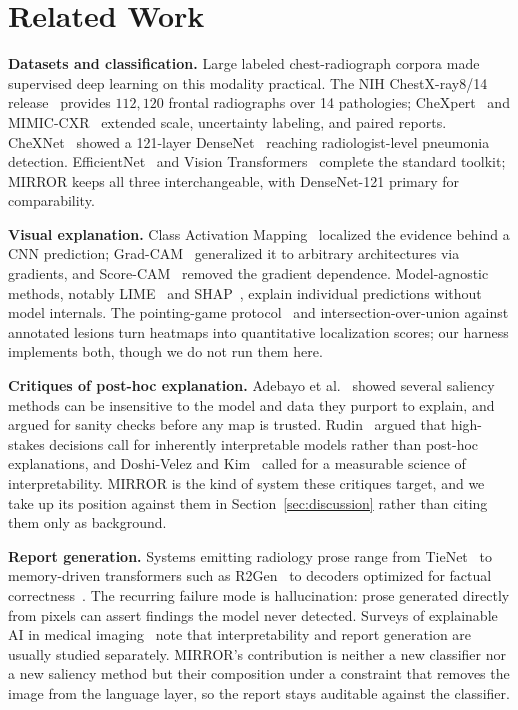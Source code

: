 \documentclass[conference]{IEEEtran}
\newcommand{\rih}[1]{\textbf{#1}\enspace\ignorespaces}
\begin{document}
\section{Related Work}
\label{sec:litreview}

\rih{Datasets and classification.} Large labeled chest-radiograph corpora made
supervised deep learning on this modality practical. The NIH ChestX-ray8/14
release~\cite{wang2017chestxray} provides $112{,}120$ frontal radiographs over 14
pathologies; CheXpert~\cite{irvin2019chexpert} and MIMIC-CXR~\cite{johnson2019mimiccxr}
extended scale, uncertainty labeling, and paired reports. CheXNet~\cite{rajpurkar2017chexnet}
showed a 121-layer DenseNet~\cite{huang2017densenet} reaching radiologist-level
pneumonia detection. EfficientNet~\cite{tan2019efficientnet} and Vision
Transformers~\cite{dosovitskiy2021vit} complete the standard toolkit; MIRROR keeps
all three interchangeable, with DenseNet-121 primary for comparability.

\rih{Visual explanation.} Class Activation Mapping~\cite{zhou2016cam} localized the
evidence behind a CNN prediction; Grad-CAM~\cite{selvaraju2017gradcam} generalized
it to arbitrary architectures via gradients, and Score-CAM~\cite{wang2020scorecam}
removed the gradient dependence. Model-agnostic methods, notably
LIME~\cite{ribeiro2016lime} and SHAP~\cite{lundberg2017shap}, explain individual
predictions without model internals. The pointing-game protocol~\cite{zhang2016pointing}
and intersection-over-union against annotated lesions turn heatmaps into
quantitative localization scores; our harness implements both, though we do not run
them here.

\rih{Critiques of post-hoc explanation.} Adebayo et al.~\cite{adebayo2018sanity}
showed several saliency methods can be insensitive to the model and data they
purport to explain, and argued for sanity checks before any map is trusted.
Rudin~\cite{rudin2019stop} argued that high-stakes decisions call for inherently
interpretable models rather than post-hoc explanations, and Doshi-Velez and
Kim~\cite{doshivelez2017rigorous} called for a measurable science of
interpretability. MIRROR is the kind of system these critiques target, and we take
up its position against them in Section~\ref{sec:discussion} rather than citing
them only as background.

\rih{Report generation.} Systems emitting radiology prose range from
TieNet~\cite{wang2018tienet} to memory-driven transformers such as
R2Gen~\cite{chen2020r2gen} to decoders optimized for factual
correctness~\cite{liu2019clinically}. The recurring failure mode is hallucination:
prose generated directly from pixels can assert findings the model never detected.
Surveys of explainable AI in medical imaging~\cite{tjoa2021survey} note that
interpretability and report generation are usually studied separately. MIRROR's
contribution is neither a new classifier nor a new saliency method but their
composition under a constraint that removes the image from the language layer, so
the report stays auditable against the classifier.
\end{document}
